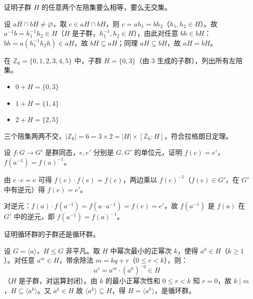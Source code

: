 \begin{homework}
证明子群 $H$ 的任意两个左陪集要么相等，要么无交集。

\begin{solution}
设 $aH \cap bH \ne \varnothing$，取 $c \in aH \cap bH$，则 $c = ah_1 = bh_2$（$h_1, h_2 \in H$）。故 $a^{-1}b = h_1^{-1}h_2 \in H$（$H$ 是子群，$h_1^{-1}, h_2 \in H$），由此对任意 $bh \in bH$：$bh = a(h_1^{-1}h_2 h) \in aH$，故 $bH \subseteq aH$；同理 $aH \subseteq bH$，故 $aH = bH$。
\end{solution}
\end{homework}

\begin{homework}[命题 1.3.3 的例子]
在 $\mathbb{Z}_6 = \{0,1,2,3,4,5\}$ 中，子群 $H = \{0, 3\}$（由 $3$ 生成的子群），列出所有左陪集。

\begin{solution}
\begin{itemize}
  \item $0 + H = \{0, 3\}$
  \item $1 + H = \{1, 4\}$
  \item $2 + H = \{2, 5\}$
\end{itemize}
三个陪集两两不交，$|\mathbb{Z}_6| = 6 = 3 \times 2 = |H| \times [\mathbb{Z}_6 : H]$，符合拉格朗日定理。
\end{solution}
\end{homework}

\begin{homework}
设 $f: G \to G'$ 是群同态，$e, e'$ 分别是 $G, G'$ 的单位元，证明 $f(e) = e'$，$f(a^{-1}) = f(a)^{-1}$。

\begin{solution}
由 $e \cdot e = e$ 可得 $f(e) \cdot f(e) = f(e)$，两边乘以 $f(e)^{-1}$（$f(e) \in G'$，在 $G'$ 中有逆元）得 $f(e) = e'$。

对逆元：$f(a) \cdot f(a^{-1}) = f(a \cdot a^{-1}) = f(e) = e'$，故 $f(a^{-1})$ 是 $f(a)$ 在 $G'$ 中的逆元，即 $f(a^{-1}) = f(a)^{-1}$。
\end{solution}
\end{homework}

\begin{homework}[循环群的子群]
证明循环群的子群还是循环群。

\begin{solution}
设 $G = \langle a \rangle$，$H \le G$ 非平凡。取 $H$ 中幂次最小的正幂次 $k$，使得 $a^k \in H$（$k \ge 1$）。对任意 $a^m \in H$，带余除法 $m = kq + r$（$0 \le r < k$），则：
\[ a^r = a^m \cdot (a^k)^{-q} \in H \]
（$H$ 是子群，对运算封闭）。由 $k$ 的最小正幂次性和 $0 \le r < k$ 知 $r = 0$，故 $k \mid m$，$H \subseteq \langle a^k \rangle$。又 $a^k \in H$ 故 $\langle a^k \rangle \subseteq H$，得 $H = \langle a^k \rangle$，是循环群。
\end{solution}
\end{homework}

